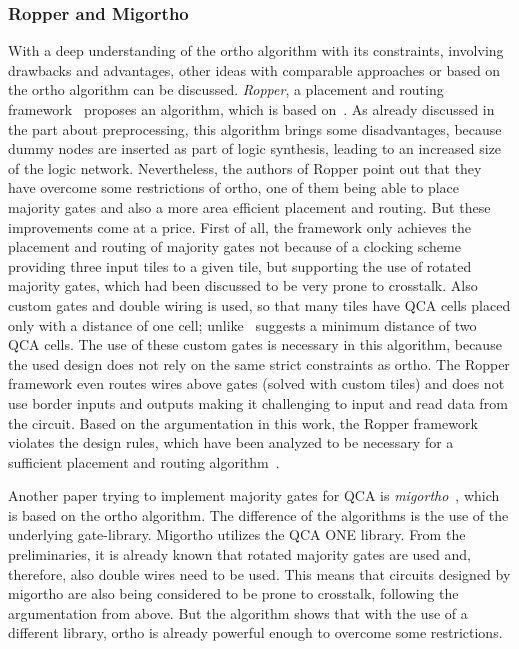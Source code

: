 \subsubsection{Ropper and Migortho}
With a deep understanding of the ortho algorithm with its constraints, involving drawbacks and advantages, other ideas with comparable approaches or based on the ortho algorithm can be discussed. \emph{Ropper}, a placement and routing framework~\cite{ropper} proposes an algorithm, which is based on~\cite{trindade2016placement}. As already discussed in the part about preprocessing, this algorithm brings some disadvantages, because dummy nodes are inserted as part of logic synthesis, leading to an increased size of the logic network. Nevertheless, the authors of Ropper point out that they have overcome some restrictions of ortho, one of them being able to place majority gates and also a more area efficient placement and routing. But these improvements come at a price. First of all, the framework only achieves the placement and routing of majority gates not because of a clocking scheme providing three input tiles to a given tile, but supporting the use of rotated majority gates, which had been discussed to be very prone to crosstalk. Also custom gates and double wiring is used, so that many tiles have QCA cells placed only with a distance of one cell; unlike~\cite{crosstalk} suggests a minimum distance of two QCA cells. The use of these custom gates is necessary in this algorithm, because the used design does not rely on the same strict constraints as ortho. The Ropper framework even routes wires above gates (solved with custom tiles) and does not use border inputs and outputs making it challenging to input and read data from the circuit. Based on the argumentation in this work, the Ropper framework violates the design rules, which have been analyzed to be necessary for a sufficient placement and routing algorithm~\cite{ropper}.

Another paper trying to implement majority gates for QCA is \emph{migortho}~\cite{migortho}, which is based on the ortho algorithm. The difference of the algorithms is the use of the underlying gate-library. Migortho utilizes the QCA ONE library. From the preliminaries, it is already known that rotated majority gates are used and, therefore, also double wires need to be used. This means that circuits designed by migortho are also being considered to be prone to crosstalk, following the argumentation from above. But the algorithm shows that with the use of a different library, ortho is already powerful enough to overcome some restrictions.

